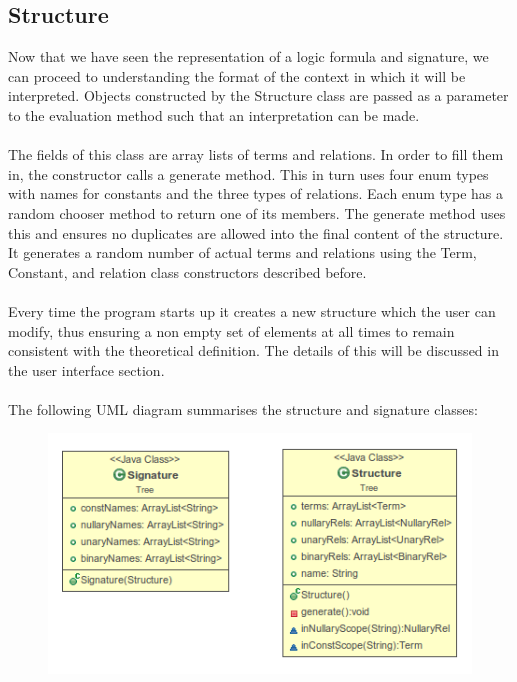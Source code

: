 \documentclass{report}
\begin{document}
\subsection{Structure}
Now that we have seen the representation of a logic formula and signature, we 
can proceed to understanding the format of the context in which it will be 
interpreted. Objects constructed by the Structure class are passed as a 
parameter to the evaluation method such that an interpretation can be made. 
\\ \\
The fields of this class are array lists of terms and relations. In order to 
fill them in, the constructor calls a generate method. This in turn uses four 
enum types with names for constants and the three types of relations. Each enum 
type has a random chooser method to return one of its members. The generate 
method uses this and ensures no duplicates are allowed into the final content of 
the structure. It generates a random number of actual terms and relations using 
the Term, Constant, and relation class constructors described before. 
\\ \\
Every time the program starts up it creates a new structure which the user can 
modify, thus ensuring a non empty set of elements at all times to remain 
consistent with the theoretical definition. The details of this will be 
discussed in the user interface section.
\\ \\
The following UML diagram\cite{uml} summarises the structure and signature 
classes:
\newpage
\begin{figure}[h!]
\centering \includegraphics[width=\textwidth]{SnS.png}
\end{figure}
\end{document}
